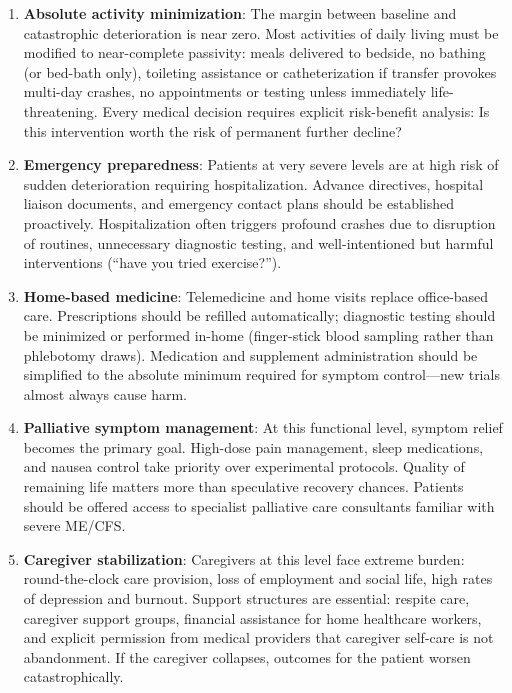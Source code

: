 \begin{enumerate}
    \item \textbf{Absolute activity minimization}: The margin between baseline and catastrophic deterioration is near zero. Most activities of daily living must be modified to near-complete passivity: meals delivered to bedside, no bathing (or bed-bath only), toileting assistance or catheterization if transfer provokes multi-day crashes, no appointments or testing unless immediately life-threatening. Every medical decision requires explicit risk-benefit analysis: Is this intervention worth the risk of permanent further decline?

    \item \textbf{Emergency preparedness}: Patients at very severe levels are at high risk of sudden deterioration requiring hospitalization. Advance directives, hospital liaison documents, and emergency contact plans should be established proactively. Hospitalization often triggers profound crashes due to disruption of routines, unnecessary diagnostic testing, and well-intentioned but harmful interventions (``have you tried exercise?'').

    \item \textbf{Home-based medicine}: Telemedicine and home visits replace office-based care. Prescriptions should be refilled automatically; diagnostic testing should be minimized or performed in-home (finger-stick blood sampling rather than phlebotomy draws). Medication and supplement administration should be simplified to the absolute minimum required for symptom control---new trials almost always cause harm.

    \item \textbf{Palliative symptom management}: At this functional level, symptom relief becomes the primary goal. High-dose pain management, sleep medications, and nausea control take priority over experimental protocols. Quality of remaining life matters more than speculative recovery chances. Patients should be offered access to specialist palliative care consultants familiar with severe ME/CFS.

    \item \textbf{Caregiver stabilization}: Caregivers at this level face extreme burden: round-the-clock care provision, loss of employment and social life, high rates of depression and burnout. Support structures are essential: respite care, caregiver support groups, financial assistance for home healthcare workers, and explicit permission from medical providers that caregiver self-care is not abandonment. If the caregiver collapses, outcomes for the patient worsen catastrophically.


\end{enumerate}
